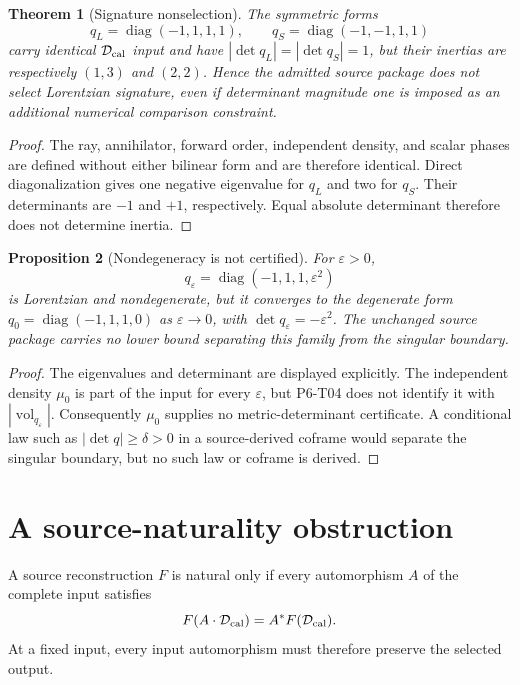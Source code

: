 \documentclass[11pt]{article}
\newtheorem{theorem}{Theorem}
\newtheorem{proposition}[theorem]{Proposition}
\newcommand{\diag}{\operatorname{diag}}
\begin{document}
\begin{theorem}[Signature nonselection]
\label{thm:signature}
The symmetric forms
\[
 q_L=\diag(-1,1,1,1),
 \qquad
 q_S=\diag(-1,-1,1,1)
\]
carry identical \(\mathcal D_{\rm cal}\) input and have
\(|\det q_L|=|\det q_S|=1\), but their inertias are respectively
\((1,3)\) and \((2,2)\). Hence the admitted source package does not select
Lorentzian signature, even if determinant magnitude one is imposed as an
additional numerical comparison constraint.
\end{theorem}

\begin{proof}
The ray, annihilator, forward order, independent density, and scalar phases
are defined without either bilinear form and are therefore identical. Direct
diagonalization gives one negative eigenvalue for \(q_L\) and two for
\(q_S\). Their determinants are \(-1\) and \(+1\), respectively. Equal
absolute determinant therefore does not determine inertia.
\end{proof}

\begin{proposition}[Nondegeneracy is not certified]
\label{prop:degeneracy}
For \(\varepsilon>0\),
\[
 q_\varepsilon=\diag(-1,1,1,\varepsilon^2)
\]
is Lorentzian and nondegenerate, but it converges to the degenerate form
\(q_0=\diag(-1,1,1,0)\) as \(\varepsilon\to0\), with
\(\det q_\varepsilon=-\varepsilon^2\). The unchanged source package carries
no lower bound separating this family from the singular boundary.
\end{proposition}

\begin{proof}
The eigenvalues and determinant are displayed explicitly. The independent
density \(\mu_0\) is part of the input for every \(\varepsilon\), but P6-T04
does not identify it with \(|\operatorname{vol}_{q_\varepsilon}|\).
Consequently \(\mu_0\) supplies no metric-determinant certificate. A
conditional law such as \(|\det q|\geq\delta>0\) in a source-derived coframe
would separate the singular boundary, but no such law or coframe is derived.
\end{proof}

\section{A source-naturality obstruction}

A source reconstruction \(F\) is natural only if every automorphism \(A\) of
the complete input satisfies
\[
 F(A\cdot\mathcal D_{\rm cal})=A^*F(\mathcal D_{\rm cal}).
\]
At a fixed input, every input automorphism must therefore preserve the
selected output.
\end{document}
